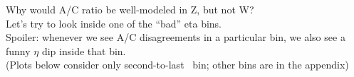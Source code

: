 {
 {
Why would A/C ratio be well-modeled in Z, but not W? \\
Let's try to look inside one of the ``bad'' eta bins. \\
Spoiler: whenever we see A/C disagreements in a particular bin, we also see a funny $\eta$ dip inside that bin. \\
(Plots below consider only second-to-last \eta\ bin; other bins are in the appendix)

}


 {
\colb[T]

}}
